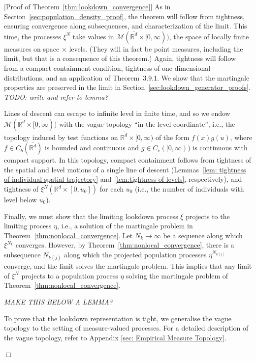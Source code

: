 \documentclass[12pt]{article}
\newenvironment {proof}{{\noindent\bf Proof }}{\hfill $\Box$ \medskip}
\newcommand{\IR}{\mathbb R}
\newcommand{\lp}{\xi}              %
\newcommand{\lpmeasures}{\mathcal{M}(\overline{\IR^d} \times [0,\infty))} %
\newcommand{\comment}[1]{{\color{blue} \it #1}}
\begin{document}
\begin{proof}[Proof of Theorem~\ref{thm:lookdown_convergence}]
    As in Section~\ref{sec:population_density_proof},
    the theorem will follow from tightness,
    ensuring convergence along subsequences,
    and characterization of the limit.
    This time, the processes $\lp^N$ take values in $\lpmeasures$,
    the space of locally finite measures on space $\times$ levels.
    (They will in fact be point measures, including the limit,
    but that is a consequence of this theorem.)
    Again, tightness will follow from a compact containment condition,
    tightness of one-dimensional distributions,
    and an application of \citet{EK} Theorem~3.9.1.
    We show that the martingale properties are preserved in the limit
    in Section~\ref{sec:lookdown_generator_proofs}.
    \comment{TODO: write and refer to lemma?}

    Lines of descent can escape to infinite level in finite time,
    and so we endow $\lpmeasures$ with the vague topology ``in the level coordinate'',
    i.e., the topology induced by test functions on $\overline{\IR^d} \times [0,\infty)$
    of the form $f(x) g(u)$, where $f \in C_b(\overline{\IR^d})$ is bounded and continuous
    and $g \in C_c([0,\infty))$ is continuous with compact support.
    In this topology, compact containment follows from
    tightness of the spatial and level motions of a single line of descent
    (Lemmas~\ref{lem: tightness of individual spatial trajectory}
    and~\ref{lem:tightness of levels}, respectively),
    and
    tightness of $\lp^N(\IR^d \times [0, u_0])$ for each $u_0$
    (i.e., the number of individuals with level below $u_0$).

    Finally, we must show that the limiting lookdown process $\lp$
    projects to the limiting process $\eta$, i.e., a solution of the martingale
    problem in Theorem~\ref{thm:nonlocal_convergence}.
    Let $N_k \to \infty$ be a sequence along which $\lp^{N_k}$ converges.
    However, by Theorem~\ref{thm:nonlocal_convergence},
    there is a subsequence $N_{k(j)}$ along which the projected population processes
    $\eta^{N_{k(j)}}$ converge, and the limit solves the martingale problem.
    This implies that any limit of $\lp^N$ projects to a population process $\eta$
    solving the martingale problem of Theorem~\ref{thm:nonlocal_convergence}.

\comment{MAKE THIS BELOW A LEMMA?}

To prove that the lookdown representation is tight, we generalise the vague
    topology to the setting of measure-valued processes. For a detailed
    description of the vague topology, refer to Appendix \ref{sec: Empirical
    Measure Topology}.


\end{proof}
\end{document}
